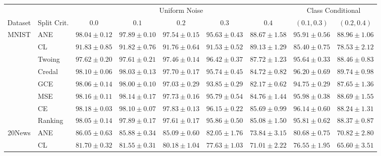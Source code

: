 \documentclass[letterpaper]{article} %
\begin{document}
\begin{table}[t] 
	\scriptsize 
	\centering 
	\begin{tabular}{clccccccc} 
&& \multicolumn{5}{c}{Uniform Noise} & \multicolumn{2}{c}{Class Conditional} \\ \cline{3-9} 
Dataset & Split Crit. & $0.0$ & $0.1$ & $0.2$ & $0.3$ & $0.4$ & $(0.1,0.3)$ & $(0.2,0.4)$  \\ \hline 
\multirow{8}{*}{MNIST}
 & ANE    & $98.04 \pm 0.12$ & $97.89 \pm 0.10$ & $97.54 \pm 0.15$ & $95.63 \pm 0.43$ & $\mathbf{88.67 \pm 1.58}$ & $\mathbf{95.91 \pm 0.56}$ & $\mathbf{88.96 \pm 1.06}$ \\ 
 & CL     & $91.83 \pm 0.85$ & $91.82 \pm 0.76$ & $91.76 \pm 0.64$ & $91.53 \pm 0.52$ & $\mathbf{89.13 \pm 1.29}$ & $85.40 \pm 0.75$ & $78.53 \pm 2.12$ \\ 
 & Twoing & $97.62 \pm 0.20$ & $97.61 \pm 0.21$ & $97.46 \pm 0.14$ & $\mathbf{96.42 \pm 0.37}$ & $\mathbf{87.72 \pm 1.23}$ & $\mathbf{95.64 \pm 0.33}$ & $\mathbf{88.46 \pm 0.83}$ \\ 
 & Credal & $98.10 \pm 0.06$ & $\mathbf{98.03 \pm 0.13}$ & $\mathbf{97.70 \pm 0.17}$ & $95.74 \pm 0.45$ & $84.72 \pm 0.82$ & $\mathbf{96.20 \pm 0.69}$ & $\mathbf{89.74 \pm 0.98}$ \\ 
 & GCE    & $\mathbf{98.06 \pm 0.14}$ & $\mathbf{98.00 \pm 0.10}$ & $97.03 \pm 0.29$ & $93.85 \pm 0.29$ & $82.17 \pm 0.62$ & $94.75 \pm 0.29$ & $87.65 \pm 1.36$ \\ 
 & MSE    & $\mathbf{98.16 \pm 0.11}$ & $\mathbf{98.14 \pm 0.17}$ & $\mathbf{97.73 \pm 0.16}$ & $\mathbf{95.79 \pm 0.54}$ & $84.76 \pm 1.44$ & $\mathbf{95.98 \pm 0.38}$ & $\mathbf{88.69 \pm 1.55}$ \\ 
 & CE     & $\mathbf{98.18 \pm 0.03}$ & $\mathbf{98.10 \pm 0.07}$ & $\mathbf{97.83 \pm 0.13}$ & $\mathbf{96.15 \pm 0.22}$ & $85.69 \pm 0.99$ & $\mathbf{96.14 \pm 0.60}$ & $\mathbf{88.24 \pm 1.31}$ \\ 
 & Ranking & $98.05 \pm 0.14$ & $\mathbf{97.89 \pm 0.17}$ & $\mathbf{97.61 \pm 0.17}$ & $\mathbf{95.86 \pm 0.50}$ & $85.08 \pm 1.50$ & $\mathbf{95.81 \pm 0.62}$ & $\mathbf{88.37 \pm 0.87}$ \\ 
\hline
\multirow{8}{*}{20News}
 & ANE    & $\mathbf{86.05 \pm 0.63}$ & $\mathbf{85.88 \pm 0.34}$ & $\mathbf{85.09 \pm 0.60}$ & $\mathbf{82.05 \pm 1.76}$ & $\mathbf{73.84 \pm 3.15}$ & $\mathbf{80.68 \pm 0.75}$ & $\mathbf{70.82 \pm 2.80}$ \\ 
 & CL     & $81.70 \pm 0.32$ & $81.55 \pm 0.31$ & $80.18 \pm 1.04$ & $77.63 \pm 1.03$ & $71.01 \pm 2.22$ & $76.55 \pm 1.95$ & $65.60 \pm 3.51$ \\ 

\end{tabular}
\end{table}
\end{document}

